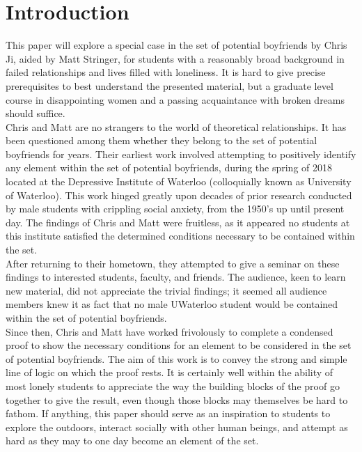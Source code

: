 \documentclass[11pt]{extarticle}
\theoremstyle{definition}
\begin{document}
\section*{Introduction}
This paper will explore a special case in the set of potential boyfriends by Chris Ji, aided by Matt Stringer, for students with a reasonably broad background in failed relationships and lives filled with loneliness. It is hard to give precise prerequisites to best understand the presented material, but a graduate level course in disappointing women and a passing acquaintance with broken dreams should suffice. \\
Chris and Matt are no strangers to the world of theoretical relationships. It has been questioned among them whether they belong to the set of potential boyfriends for years. Their earliest work involved attempting to positively identify any element within the set of potential boyfriends, during the spring of 2018 located at the Depressive Institute of Waterloo (colloquially known as University of Waterloo). This work hinged greatly upon decades of prior research conducted by male students with crippling social anxiety, from the 1950’s up until present day. The findings of Chris and Matt were fruitless, as it appeared no students at this institute satisfied the determined conditions necessary to be contained within the set. \\
After returning to their hometown, they attempted to give a seminar on these findings to interested students, faculty, and friends. The audience, keen to learn new material, did not appreciate the trivial findings; it seemed all audience members knew it as fact that no male UWaterloo student would be contained within the set of potential boyfriends.\\
Since then, Chris and Matt have worked frivolously to complete a condensed proof to show the necessary conditions for an element to be considered in the set of potential boyfriends. The aim of this work is to convey the strong and simple line of logic on which the proof rests. It is certainly well within the ability of most lonely students to appreciate the way the building blocks of the proof go together to give the result, even though those blocks may themselves be hard to fathom. If anything, this paper should serve as an inspiration to students to explore the outdoors, interact socially with other human beings, and attempt as hard as they may to one day become an element of the set.
\end{document}
